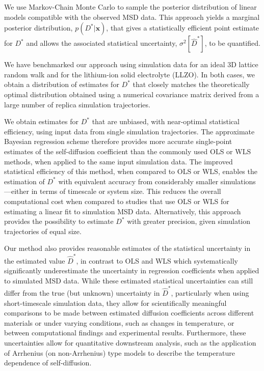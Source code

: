 \documentclass[reprint,superscriptaddress,nobibnotes,amsmath,amssymb,aps,prx,hidelinks,linenumbers]{revtex4-2}
\newcommand{\oMSD}{\ensuremath{\bm{x}}}
\newcommand{\prob}[1]{\ensuremath{p(#1)}}
\newcommand{\Dest}{\ensuremath{\widehat{D}^*}}
\newcommand{\D}{\ensuremath{D^*}}
\newcommand{\var}[1]{\ensuremath{\sigma^2[#1]}}
\begin{document}
We use Markov-Chain Monte Carlo to sample the posterior distribution of linear models compatible with the observed MSD data.
This approach yields a marginal posterior distribution, $\prob{\D | \oMSD}$, that gives a statistically efficient point estimate for $\D$ and allows the associated statistical uncertainty, $\var{\Dest}$, to be quantified.

We have benchmarked our approach using simulation data for an ideal 3D lattice random walk and for the lithium-ion solid electrolyte  (LLZO).
In both cases, we obtain a distribution of estimates for $\D$ that closely matches the theoretically optimal distribution obtained using a numerical covariance matrix derived from a large number of replica simulation trajectories.

We obtain estimates for $\D$ that are unbiased, with near-optimal statistical efficiency, using input data from single simulation trajectories.
The approximate Bayesian regression scheme therefore provides more accurate single-point estimates of the self-diffusion coefficient than the commonly used OLS or WLS methods, when applied to the same input simulation data.
The improved statistical efficiency of this method, when compared to OLS or WLS, enables the estimation of $\D$ with equivalent accuracy from considerably smaller simulations---either in terms of timescale or system size. 
This reduces the overall computational cost when compared to studies that use OLS or WLS for estimating a linear fit to simulation MSD data.
Alternatively, this approach provides the possibility to estimate $\D$ with greater precision, given simulation trajectories of equal size.

Our method also provides reasonable estimates of the statistical uncertainty in the estimated value $\Dest$, in contrast to OLS and WLS which systematically significantly underestimate the uncertainty in regression coefficients when applied to simulated MSD data. 
While these estimated statistical uncertainties can still differ from the true (but unknown) uncertainty in $\Dest$, particularly when using short-timescale simulation data, they allow for scientifically meaningful comparisons to be made between estimated diffusion coefficients across different materials or under varying conditions, such as changes in temperature, or between computational findings and experimental results.
Furthermore, these uncertainties allow for quantitative downstream analysis, such as the application of Arrhenius (on non-Arrhenius) type models to describe the temperature dependence of self-diffusion.
\end{document}
